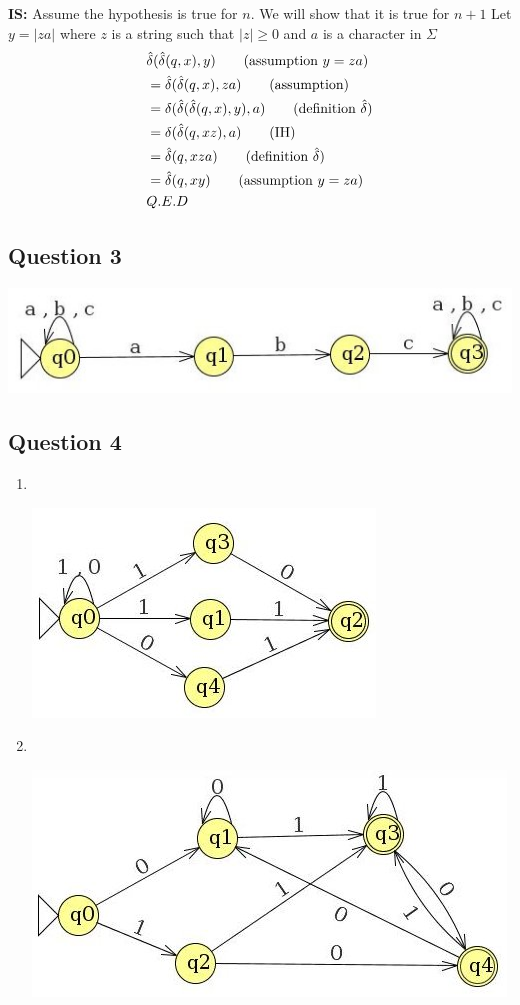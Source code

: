\documentclass[12pt,a4paper]{article}
\begin{document}
		\noindent
		\textbf{IS:} Assume the hypothesis is true for $n$. We will show that it is true for $n+1$ 
		\noindent
		Let $y=|za|$ where $z$ is a string such that $|z| \ge 0$ and $a$ is a character in $\Sigma$
		\begin{align*}
			&\hat{\delta}(\hat{\delta}(q,x),y)				\tag{assumption $y=za$}
			\\ &= \hat{\delta}(\hat{\delta}(q,x),za) 		\tag{assumption}
			\\ &= \delta(\hat{\delta}(\hat{\delta}(q,x),y),a) \tag{definition $\hat{\delta}$}
			\\ &= \delta(\hat{\delta}(q,xz),a)				\tag{IH}
			\\ &= \hat{\delta}(q,xza)						\tag{definition $\hat{\delta}$}
			\\ &= \hat{\delta}(q,xy)						\tag{assumption $y=za$}
			\\ &Q.E.D
		\end{align*}
	
	\subsection*{Question 3}
		\begin{center}
			\includegraphics[width=0.7\linewidth]{a1q3}
		\end{center}

	\subsection*{Question 4}
		\begin{enumerate}
			\item ~\\
				\begin{center}
					\includegraphics[width=0.5\linewidth]{a1q4nfa}
				\end{center}
			\item ~\\
			\begin{center}
				\includegraphics[width=0.7\linewidth]{a1q4dfa}
			\end{center}
		\end{enumerate}
	
\end{document}
